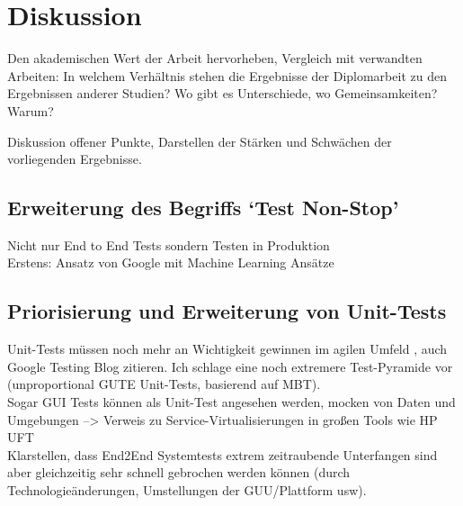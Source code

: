 \makeatletter\ifthesis@masterthesis
\chapter{Diskussion}
\label{sec:discussion}

Den akademischen Wert der Arbeit hervorheben, Vergleich mit verwandten Arbeiten: In welchem Verhältnis stehen die Ergebnisse der Diplomarbeit zu den Ergebnissen anderer Studien? Wo gibt es Unterschiede, wo Gemeinsamkeiten? Warum?

Diskussion offener Punkte, Darstellen der Stärken und Schwächen der vorliegenden Ergebnisse.


\section{Erweiterung des Begriffs `Test Non-Stop'}
Nicht nur End to End Tests sondern Testen in Produktion\\
Erstens: Ansatz von Google mit Machine Learning Ansätze

\section{Priorisierung und Erweiterung von Unit-Tests}
Unit-Tests müssen noch mehr an Wichtigkeit gewinnen im agilen Umfeld \cite{linz_testing_2014}, auch Google Testing Blog zitieren. Ich schlage eine noch extremere Test-Pyramide vor (unproportional GUTE Unit-Tests, basierend auf MBT).\\
Sogar GUI Tests können als Unit-Test angesehen werden, mocken von Daten und Umgebungen --> Verweis zu Service-Virtualisierungen in großen Tools wie HP UFT\\
Klarstellen, dass End2End Systemtests extrem zeitraubende Unterfangen sind aber gleichzeitig sehr schnell gebrochen werden können (durch Technologieänderungen, Umstellungen der GUU/Plattform usw).

